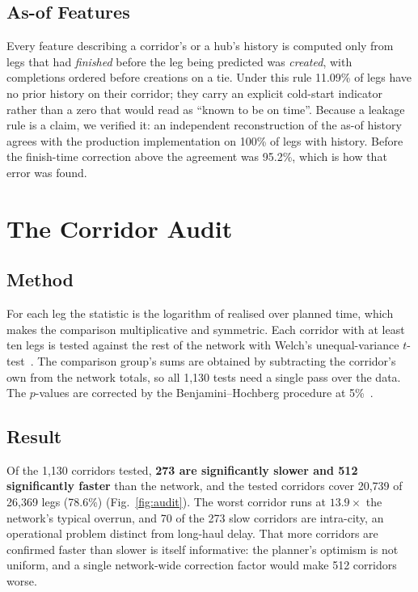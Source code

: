 \documentclass[conference]{IEEEtran}
\begin{document}
\subsection{As-of Features}
Every feature describing a corridor's or a hub's history is computed only from legs that had \emph{finished} before the leg being predicted was \emph{created}, with completions ordered before creations on a tie. Under this rule 11.09\% of legs have no prior history on their corridor; they carry an explicit cold-start indicator rather than a zero that would read as ``known to be on time''. Because a leakage rule is a claim, we verified it: an independent reconstruction of the as-of history agrees with the production implementation on 100\% of legs with history. Before the finish-time correction above the agreement was 95.2\%, which is how that error was found.

\section{The Corridor Audit}\label{sec:audit}

\subsection{Method}
For each leg the statistic is the logarithm of realised over planned time, which makes the comparison multiplicative and symmetric. Each corridor with at least ten legs is tested against the rest of the network with Welch's unequal-variance $t$-test~\cite{welch1947}. The comparison group's sums are obtained by subtracting the corridor's own from the network totals, so all 1,130 tests need a single pass over the data. The $p$-values are corrected by the Benjamini--Hochberg procedure at 5\%~\cite{bh1995}.

\subsection{Result}
Of the 1,130 corridors tested, \textbf{273 are significantly slower and 512 significantly faster} than the network, and the tested corridors cover 20,739 of 26,369 legs (78.6\%) (Fig.~\ref{fig:audit}). The worst corridor runs at $13.9\times$ the network's typical overrun, and 70 of the 273 slow corridors are intra-city, an operational problem distinct from long-haul delay. That more corridors are confirmed faster than slower is itself informative: the planner's optimism is not uniform, and a single network-wide correction factor would make 512 corridors worse.
\end{document}
